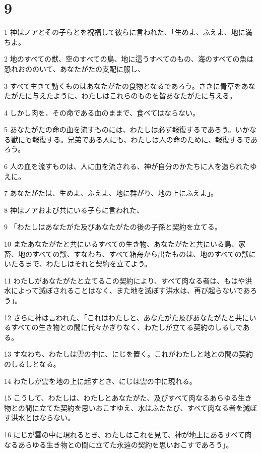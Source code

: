\chapter{9}

\par 1 神はノアとその子らとを祝福して彼らに言われた、「生めよ、ふえよ、地に満ちよ。
\par 2 地のすべての獣、空のすべての鳥、地に這うすべてのもの、海のすべての魚は恐れおののいて、あなたがたの支配に服し、
\par 3 すべて生きて動くものはあなたがたの食物となるであろう。さきに青草をあなたがたに与えたように、わたしはこれらのものを皆あなたがたに与える。
\par 4 しかし肉を、その命である血のままで、食べてはならない。
\par 5 あなたがたの命の血を流すものには、わたしは必ず報復するであろう。いかなる獣にも報復する。兄弟である人にも、わたしは人の命のために、報復するであろう。
\par 6 人の血を流すものは、人に血を流される、神が自分のかたちに人を造られたゆえに。
\par 7 あなたがたは、生めよ、ふえよ、地に群がり、地の上にふえよ」。
\par 8 神はノアおよび共にいる子らに言われた、
\par 9 「わたしはあなたがた及びあなたがたの後の子孫と契約を立てる。
\par 10 またあなたがたと共にいるすべての生き物、あなたがたと共にいる鳥、家畜、地のすべての獣、すなわち、すべて箱舟から出たものは、地のすべての獣にいたるまで、わたしはそれと契約を立てよう。
\par 11 わたしがあなたがたと立てるこの契約により、すべて肉なる者は、もはや洪水によって滅ぼされることはなく、また地を滅ぼす洪水は、再び起らないであろう」。
\par 12 さらに神は言われた、「これはわたしと、あなたがた及びあなたがたと共にいるすべての生き物との間に代々かぎりなく、わたしが立てる契約のしるしである。
\par 13 すなわち、わたしは雲の中に、にじを置く。これがわたしと地との間の契約のしるしとなる。
\par 14 わたしが雲を地の上に起すとき、にじは雲の中に現れる。
\par 15 こうして、わたしは、わたしとあなたがた、及びすべて肉なるあらゆる生き物との間に立てた契約を思いおこすゆえ、水はふたたび、すべて肉なる者を滅ぼす洪水とはならない。
\par 16 にじが雲の中に現れるとき、わたしはこれを見て、神が地上にあるすべて肉なるあらゆる生き物との間に立てた永遠の契約を思いおこすであろう」。
